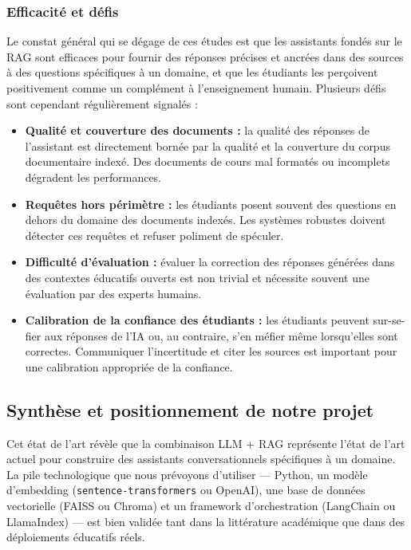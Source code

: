 \documentclass[a4paper,11pt]{article}
\begin{document}
\subsubsection{Efficacité et défis}

Le constat général qui se dégage de ces études est que les assistants
fondés sur le RAG sont efficaces pour fournir des réponses précises et
ancrées dans des sources à des questions spécifiques à un domaine, et que
les étudiants les perçoivent positivement comme un complément à
l'enseignement humain. Plusieurs défis sont cependant régulièrement
signalés :

\begin{itemize}
  \item \textbf{Qualité et couverture des documents :} la qualité des
    réponses de l'assistant est directement bornée par la qualité et
    la couverture du corpus documentaire indexé. Des documents de cours
    mal formatés ou incomplets dégradent les performances.
  \item \textbf{Requêtes hors périmètre :} les étudiants posent souvent
    des questions en dehors du domaine des documents indexés. Les systèmes
    robustes doivent détecter ces requêtes et refuser poliment de spéculer.
  \item \textbf{Difficulté d'évaluation :} évaluer la correction des
    réponses générées dans des contextes éducatifs ouverts est non trivial
    et nécessite souvent une évaluation par des experts humains.
  \item \textbf{Calibration de la confiance des étudiants :} les étudiants
    peuvent sur-se-fier aux réponses de l'IA ou, au contraire, s'en méfier
    même lorsqu'elles sont correctes. Communiquer l'incertitude et citer
    les sources est important pour une calibration appropriée de la
    confiance.
\end{itemize}

\newpage
\subsection{Synthèse et positionnement de notre projet}

Cet état de l'art révèle que la combinaison LLM + RAG représente l'état
de l'art actuel pour construire des assistants conversationnels spécifiques
à un domaine. La pile technologique que nous prévoyons d'utiliser ---
Python, un modèle d'embedding (\texttt{sentence-transformers} ou OpenAI),
une base de données vectorielle (FAISS ou Chroma) et un framework
d'orchestration (LangChain ou LlamaIndex) --- est bien validée tant dans
la littérature académique que dans des déploiements éducatifs réels.
\end{document}
